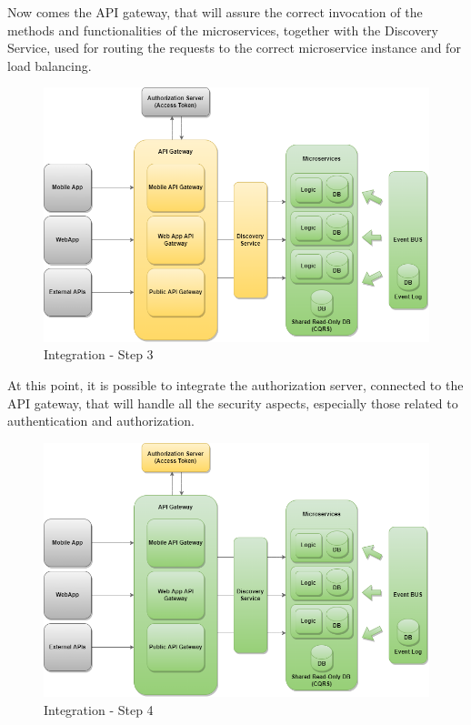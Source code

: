 Now comes the API gateway, that will assure the correct invocation of the methods and functionalities of the microservices, together with the Discovery Service, used for routing the requests to the correct microservice instance and for load balancing.

\begin{figure}[H]
	\centering
    \includegraphics[scale=0.4]{Images/Impl, Integr & Test/Integration Plan - Step 3.png}
	\caption{\label{fig:integration_plan_step_3}Integration - Step 3}
\end{figure}

At this point, it is possible to integrate the authorization server, connected to the API gateway, that will handle all the security aspects, especially those related to authentication and authorization. 

\begin{figure}[H]
	\centering
    \includegraphics[scale=0.4]{Images/Impl, Integr & Test/Integration Plan - Step 4.png}
	\caption{\label{fig:integration_plan_step_4}Integration - Step 4}
\end{figure}


